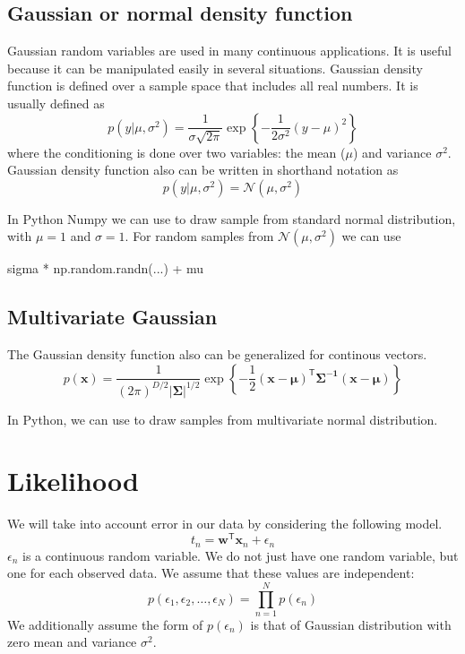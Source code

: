 \subsection{Gaussian or normal density function}

Gaussian random variables are used in many continuous applications. It is useful
because it can be manipulated easily in several situations. Gaussian density function
is defined over a sample space that includes all real numbers. It is usually defined as
\begin{equation}
p(y|\mu,\sigma^2) = \frac{1}{\sigma\sqrt{2\pi}}\exp\left\{
-\frac{1}{2\sigma^2}(y - \mu)^2
\right\}
\end{equation}
where the conditioning is done over two variables: the mean ($\mu$) and variance $\sigma^2$.
Gaussian density function also can be written in shorthand notation as
\begin{equation}
p(y|\mu,\sigma^2) = \mathcal{N}(\mu, \sigma^2)
\end{equation}

In Python Numpy we can use 
to draw sample from standard normal distribution, with $\mu=1$
and $\sigma=1$.
For random samples from $\mathcal{N}(\mu, \sigma^2)$ we can use
\begin{pythoncode}
sigma * np.random.randn(...) + mu
\end{pythoncode}


\subsection{Multivariate Gaussian}

The Gaussian density function also can be generalized for continous vectors.
\begin{equation}
p(\mathbf{x}) = \frac{1}{(2\pi)^{D/2}|\boldsymbol{\Sigma}|^{1/2}}
\exp\left\{-\frac{1}{2}(\mathbf{x}-\boldsymbol{\mu})^{\mathsf{T}}
\boldsymbol{\Sigma^{-1}}
(\mathbf{x}-\boldsymbol{\mu})
\right\}
\end{equation}

In Python, we can use 
to draw samples from multivariate normal distribution.


\section{Likelihood}
We will take into account error in our data by considering the following model.
\begin{equation}
t_{n} = \mathbf{w}^{\mathsf{T}}\mathbf{x}_{n} + \epsilon_{n}
\end{equation}
$\epsilon_{n}$ is a continuous random variable.
We do not just have one random variable, but one for each observed data.
We assume that these values are independent:
\begin{equation}
p(\epsilon_{1},\epsilon_{2},\ldots,\epsilon_{N}) = \prod_{n=1}^{N} p(\epsilon_{n})
\end{equation}
We additionally assume the form of $p(\epsilon_{n})$ is that of Gaussian
distribution with zero mean and variance $\sigma^2$.

